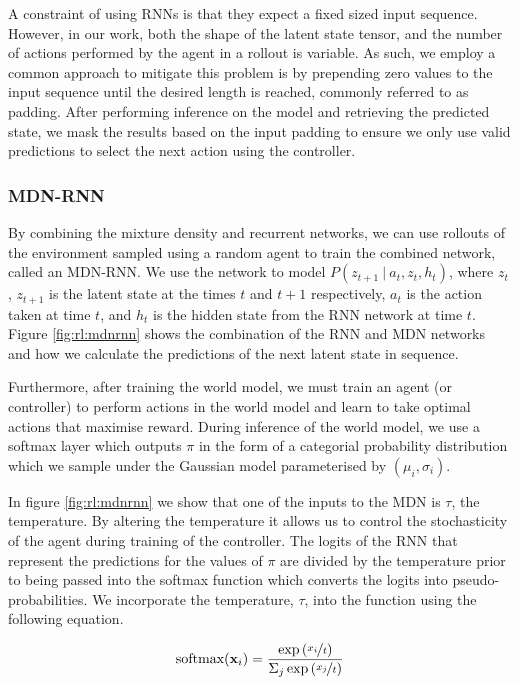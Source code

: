 A constraint of using RNNs is that they expect a fixed sized input sequence. However, in our work, both the shape of the latent state tensor, and the number of actions performed by the agent in a rollout is variable. As such, we employ a common approach to mitigate this problem is by prepending zero values to the input sequence until the desired length is reached, commonly referred to as padding. After performing inference on the model and retrieving the predicted state, we mask the results based on the input padding to ensure we only use valid predictions to select the next action using the controller.

\subsubsection{MDN-RNN}

By combining the mixture density and recurrent networks, we can use rollouts of the environment sampled using a random agent to train the combined network, called an MDN-RNN. We use the network to model $P(z_{t+1}~|~a_t, z_t, h_t)$, where $z_t$, $z_{t+1}$ is the latent state at the times $t$ and $t+1$ respectively, $a_t$ is the action taken at time $t$, and $h_t$ is the hidden state from the RNN network at time $t$. Figure \ref{fig:rl:mdnrnn} shows the combination of the RNN and MDN networks and how we calculate the predictions of the next latent state in sequence.

Furthermore, after training the world model, we must train an agent (or controller) to perform actions in the world model and learn to take optimal actions that maximise reward. During inference of the world model, we use a softmax layer which outputs $\pi$ in the form of a categorial probability distribution which we sample under the Gaussian model parameterised by $(\mu_i, \sigma_i)$.

In figure \ref{fig:rl:mdnrnn} we show that one of the inputs to the MDN is $\tau$, the temperature. By altering the temperature it allows us to control the stochasticity of the agent during training of the controller. The logits of the RNN that represent the predictions for the values of $\pi$ are divided by the temperature prior to being passed into the softmax function which converts the logits into pseudo-probabilities. We incorporate the temperature, $\tau$, into the function using the following equation.

$$
\text{softmax}(\mathbf{x}_i) = \frac{\exp\left( \nicefrac{x_i}{t} \right) }{\Sigma_j \exp \left( \nicefrac{x_j}{t} \right) }
$$


